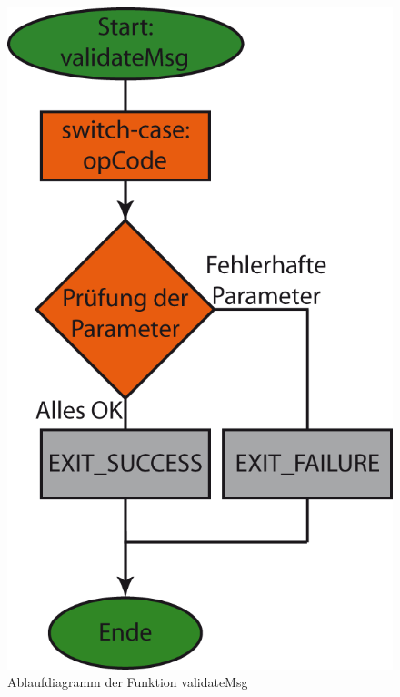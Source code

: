 \begin{figure}[h]
\includegraphics[scale = 0.8]{./validateMsg.png}
\hspace{-14pt}
\caption{Ablaufdiagramm der Funktion validateMsg}
\end{figure} 

